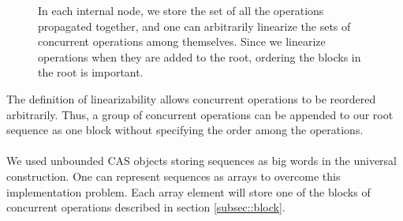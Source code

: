\documentclass[10pt]{article}
\newtheorem{lemma}[theorem]{Lemma}
\theoremstyle{definition}
\begin{document}
 \begin{figure}[h]
\begin{center}
\caption{\label{fig::set} In each internal node, we store the set of all the operations propagated together, and one can arbitrarily linearize the sets of concurrent operations among themselves. Since we linearize operations when they are added to the root, ordering the blocks in the root is important.}
\end{center}
\end{figure}


The definition of linearizability allows concurrent operations to be reordered arbitrarily. Thus, a group of concurrent operations can be appended to our root sequence as one block without specifying the order among the operations.




\paragraph{}
 We used unbounded CAS objects storing sequences as big words in the universal construction. One can represent sequences as arrays to overcome this implementation problem. Each array element will store one of the blocks of concurrent operations described in section \ref{subsec::block}.
 
\end{document}
